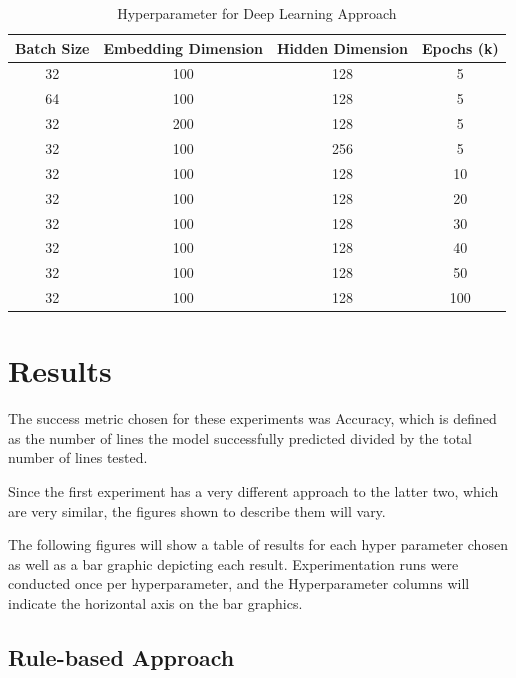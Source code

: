 \begin{table}[H]
\begin{center}
\begin{tabular}{||c|c|c|c||}
    \hline
    Batch Size & Embedding Dimension & Hidden Dimension & Epochs (k) \\
    \hline
    32 & 100 & 128 & 5 \\
    64 & 100 & 128 & 5 \\
    32 & 200 & 128 & 5 \\
    32 & 100 & 256 & 5 \\
    32 & 100 & 128 & 10 \\
    32 & 100 & 128 & 20 \\
    32 & 100 & 128 & 30 \\
    32 & 100 & 128 & 40 \\
    32 & 100 & 128 & 50 \\
    32 & 100 & 128 & 100 \\
    \hline
\end{tabular}
\caption[Deep Learning Hyperparameters]{Hyperparameter for Deep Learning Approach}
\label{tab:dl-hyperparameters}
\end{center}
\end{table}

\section{Results}

The success metric chosen for these experiments was Accuracy, which is defined as the number of lines the model successfully predicted divided by the total number of lines tested.

Since the first experiment has a very different approach to the latter two, which are very similar, the figures shown to describe them will vary.

The following figures will show a table of results for each hyper parameter chosen as well as a bar graphic depicting each result. Experimentation runs were conducted once per hyperparameter, and the Hyperparameter columns will indicate the horizontal axis on the bar graphics.

\subsection{Rule-based Approach}

